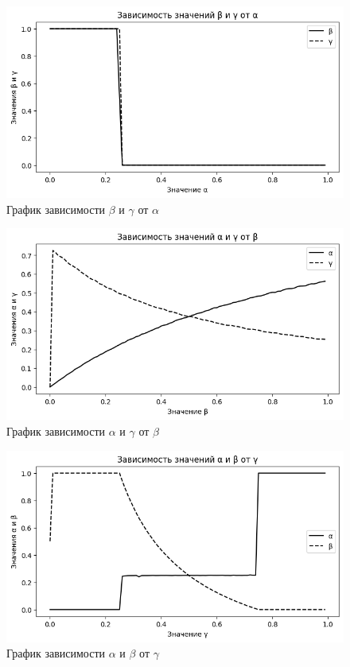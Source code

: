 \begin{figure}[H]
	\centering
	\includegraphics[width=0.8\linewidth]{inc/img/c3ex2alpha}
	\caption{График зависимости $ \beta$ и $ \gamma$ от $ \alpha$}
	\label{fig:c3ex2alpha}
\end{figure}

\begin{figure}[H]
	\centering
	\includegraphics[width=0.8\linewidth]{inc/img/c3ex2beta}
	\caption{График зависимости $\alpha $ и $ \gamma$ от $ \beta$}
	\label{fig:c3ex2beta}
\end{figure}

\begin{figure}[H]
	\centering
	\includegraphics[width=0.8\linewidth]{inc/img/c3ex2gamma}
	\caption{График зависимости $\alpha $ и $ \beta$ от $ \gamma$}
	\label{fig:c3ex2gamma}
\end{figure}

